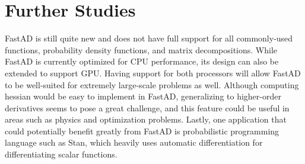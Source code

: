 \section{Further Studies}

FastAD is still quite new and 
does not have full support for all commonly-used functions,
probability density functions,
and matrix decompositions.
While FastAD is currently optimized for CPU performance,
its design can also be extended to support GPU.\@
Having support for both processors will allow FastAD
to be well-suited for extremely large-scale problems as well.
Although computing hessian would be easy to implement in FastAD,
generalizing to higher-order derivatives seems to pose a great challenge,
and this feature could be useful in areas such as physics and optimization problems.
Lastly, one application that could potentially benefit greatly from FastAD 
is probabilistic programming language such as Stan,
which heavily uses automatic differentiation for differentiating scalar functions.
